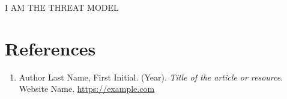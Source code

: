 \documentclass[letterpaper]{article}
\begin{document}
I AM THE THREAT MODEL


\newpage
\section{References}


\begin{enumerate}[leftmargin=2em]
    \item Author Last Name, First Initial. (Year). \textit{Title of the article or resource}. Website Name. \href{https://example.com}{https://example.com}
\end{enumerate}
\end{document}
